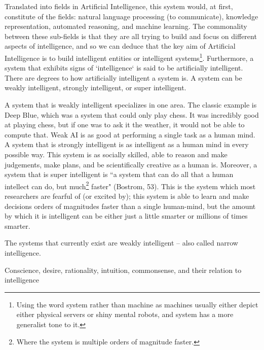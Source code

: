 \documentclass[11pt]{article}
\begin{document}
\par Translated into fields in Artificial Intelligence, this system would, at first, constitute of the fields: natural language processing (to communicate), knowledge representation, automated reasoning, and machine learning. The commonality between these sub-fields is that they are all trying to build and focus on different aspects of intelligence, and so we can deduce that the key aim of Artificial Intelligence is to build intelligent entities or intelligent systems\footnote{Using the word system rather than machine as machines usually either depict either physical servers or shiny mental robots, and system has a more generalist tone to it.}. Furthermore, a system that exhibits signs of `intelligence` is said to be artificially intelligent. There are degrees to how artificially intelligent a system is. A system can be weakly intelligent, strongly intelligent, or super intelligent. 

\par A system that is weakly intelligent specializes in one area. The classic example is Deep Blue, which was a system that could only play chess. It was incredibly good at playing chess, but if one was to ask it the weather, it would not be able to compute that. Weak AI is as good at performing a single task as a human mind. A system that is strongly intelligent is as intelligent as a human mind in every possible way. This system is as socially skilled, able to reason and make judgements, make plans, and be scientifically creative as a human is. Moreover, a system that is super intelligent is ``a system that can do all that a human intellect can do, but much\footnote{Where the system is multiple orders of magnitude faster.} faster" (Bostrom, 53). This is the system which most researchers are fearful of (or excited by); this system is able to learn and make decisions orders of magnitudes faster than a single human-mind, but the amount by which it is intelligent can be either just a little smarter or millions of times smarter.

\par The systems that currently exist are weakly intelligent -- also called narrow intelligence. 
\newline

\begin{center}
	{\large Conscience, desire, rationality, intuition, commonsense, and their relation to intelligence\par}
\end{center}
\end{document}
